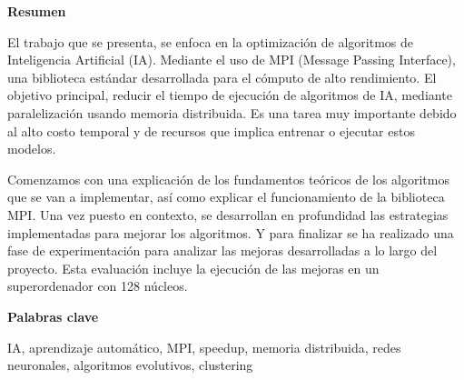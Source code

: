 
\newpage

\thispagestyle{empty}

\begin{center}

{\bf \Huge Resumen}

  \end{center}
\vspace{1cm}

El trabajo que se presenta, se enfoca en la optimización de algoritmos de Inteligencia  Artificial (IA). Mediante el uso de MPI (Message Passing Interface), una biblioteca estándar desarrollada para el cómputo de alto rendimiento. 
El objetivo principal, reducir el tiempo de ejecución de algoritmos de IA, mediante paralelización usando memoria distribuida. Es una tarea muy importante debido al alto costo temporal y de recursos que implica entrenar o ejecutar estos modelos.

Comenzamos con una explicación de los fundamentos teóricos de los algoritmos que se van a implementar, así como explicar el funcionamiento de la biblioteca MPI. 
Una vez puesto en contexto, se desarrollan en profundidad las estrategias implementadas para mejorar los algoritmos.
Y para finalizar se ha realizado una fase de experimentación para analizar las mejoras desarrolladas a lo largo del proyecto. Esta evaluación incluye la ejecución de las mejoras en un superordenador con 128 núcleos.

\vspace{1cm}


\begin{center}

{\bf \Large Palabras clave}

   \end{center}

   \vspace{0.5cm}
   
   IA, aprendizaje automático, MPI, speedup, memoria distribuida, redes neuronales, algoritmos evolutivos, clustering
   
   


